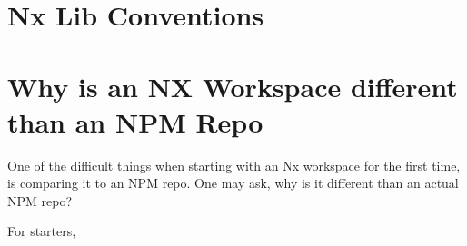 \maketitle{}
\section{ Nx Lib Conventions }

\section{ Why is an NX Workspace different than an NPM Repo }
One of the difficult things when starting with an Nx workspace for the first
time, is comparing it to an NPM repo. One may ask, why is it different than an
actual NPM repo?

For starters, 
